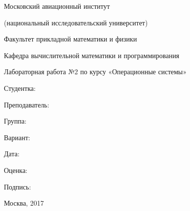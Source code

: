 \documentclass[a4paper,portrait,12pt]{article}
\begin{document}
\begin{flushleft}
Московский авиационный институт
\end{flushleft}


\begin{flushleft}
(национальный исследовательский университет)
\end{flushleft}





\begin{flushleft}
Факультет прикладной математики и физики
\end{flushleft}





\begin{flushleft}
Кафедра вычислительной математики и программирования
\end{flushleft}





\begin{flushleft}
Лабораторная работа №2 по курсу «Операционные системы»
\end{flushleft}





\begin{flushleft}
Студентка:
\end{flushleft}


\begin{flushleft}
Преподаватель:
\end{flushleft}


\begin{flushleft}
Группа:
\end{flushleft}


\begin{flushleft}
Вариант:
\end{flushleft}


\begin{flushleft}
Дата:
\end{flushleft}


\begin{flushleft}
Оценка:
\end{flushleft}


\begin{flushleft}
Подпись:
\end{flushleft}





\begin{flushleft}
Москва, 2017
\end{flushleft}
\end{document}
